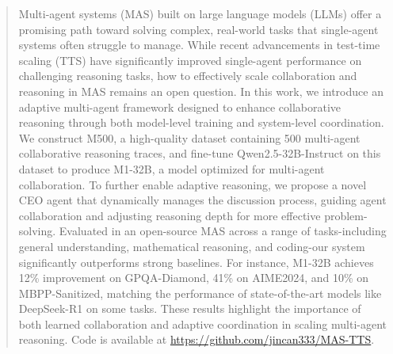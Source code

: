\begin{abstract}

Multi-agent systems (MAS) built on large language models (LLMs) offer a promising path toward solving complex, real-world tasks that single-agent systems often struggle to manage. While recent advancements in test-time scaling (TTS) have significantly improved single-agent performance on challenging reasoning tasks, how to effectively scale collaboration and reasoning in MAS remains an open question. In this work, we introduce an adaptive multi-agent framework designed to enhance collaborative reasoning through both model-level training and system-level coordination. We construct M500, a high-quality dataset containing 500 multi-agent collaborative reasoning traces, and fine-tune Qwen2.5-32B-Instruct on this dataset to produce M1-32B, a model optimized for multi-agent collaboration. To further enable adaptive reasoning, we propose a novel CEO agent that dynamically manages the discussion process, guiding agent collaboration and adjusting reasoning depth for more effective problem-solving. Evaluated in an open-source MAS across a range of tasks-including general understanding, mathematical reasoning, and coding-our system significantly outperforms strong baselines. For instance, M1-32B achieves 12\% improvement on GPQA-Diamond, 41\% on AIME2024, and 10\% on MBPP-Sanitized, matching the performance of state-of-the-art models like DeepSeek-R1 on some tasks. These results highlight the importance of both learned collaboration and adaptive coordination in scaling multi-agent reasoning. Code is available at \url{https://github.com/jincan333/MAS-TTS}.

\end{abstract}